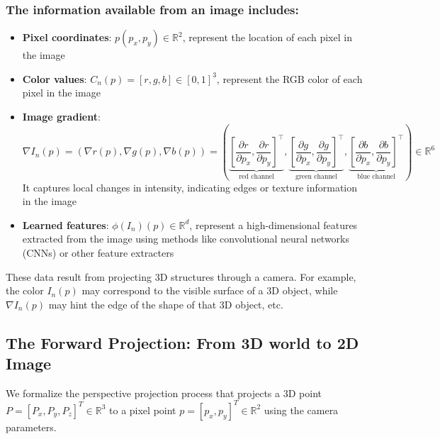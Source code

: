 \documentclass[12pt]{article}
\begin{document}
\subsubsection*{The information available from an image includes:}
\begin{itemize}
    \item   \textbf{Pixel coordinates}: $p(p_x,p_y) \in \mathbb{R}^2$, represent the location of each pixel in the image
    \item   \textbf{Color values}: $C_n(p) = [r,g,b] \in [0,1]^3$, represent the RGB color of each pixel in the image
    \item   \textbf{Image gradient}: 
                \[
                \nabla I_n(p) = \left( \nabla r(p), \nabla g(p), \nabla b(p) \right) = \left( \underbrace{\left[ \frac{\partial r}{\partial p_x}, \frac{\partial r}{\partial p_y} \right]^\top}_{\text{red channel}}, \underbrace{\left[ \frac{\partial g}{\partial p_x}, \frac{\partial g}{\partial p_y} \right]^\top}_{\text{green channel}}, \underbrace{\left[ \frac{\partial b}{\partial p_x}, \frac{\partial b}{\partial p_y} \right]^\top}_{\text{blue channel}} \right) \in \mathbb{R}^6
                \]
            It captures local changes in intensity, indicating edges or texture information in the image
    \item   \textbf{Learned features}: $\phi(I_n)(p) \in \mathbb{R}^d$, represent a high-dimensional features extracted from the image using methods like convolutional neural networks (CNNs) or other feature extracters
\end{itemize}
These data result from projecting 3D structures through a camera. For example, the color $I_n(p)$ may correspond to the visible surface of a 3D object, while $\nabla I_n(p)$ may hint the edge of the shape of that 3D object, etc.

\newpage

\subsection{The Forward Projection: From 3D world to 2D Image}
We formalize the perspective projection process that projects a 3D point $P=[P_x,P_y,P_z]^T \in \mathbb{R}^3$ to a pixel point $p=[p_x,p_y]^T \in \mathbb{R}^2$ using the camera parameters.
\end{document}
